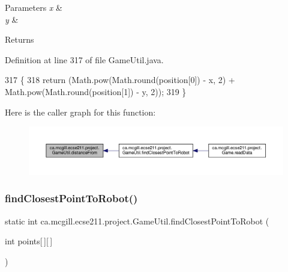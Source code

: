 \begin{DoxyParams}{Parameters}
{\em x} & \\
\hline
{\em y} & \\
\hline
\end{DoxyParams}
\begin{DoxyReturn}{Returns}

\end{DoxyReturn}


Definition at line 317 of file Game\+Util.\+java.


\begin{DoxyCode}
317                                                                      \{
318     \textcolor{keywordflow}{return} (Math.pow(Math.round(position[0]) - x, 2) + Math.pow(Math.round(position[1]) - y, 2));
319   \}
\end{DoxyCode}
Here is the caller graph for this function\+:\nopagebreak
\begin{figure}[H]
\begin{center}
\leavevmode
\includegraphics[width=350pt]{classca_1_1mcgill_1_1ecse211_1_1project_1_1_game_util_a6fb324a3d5e42414c83dfd8bd5910b56_icgraph}
\end{center}
\end{figure}
\mbox{\label{classca_1_1mcgill_1_1ecse211_1_1project_1_1_game_util_a6e0ee94b800ca3727ca8009782abda14}} 
\subsubsection{\texorpdfstring{find\+Closest\+Point\+To\+Robot()}{findClosestPointToRobot()}}
{\footnotesize\ttfamily static int ca.\+mcgill.\+ecse211.\+project.\+Game\+Util.\+find\+Closest\+Point\+To\+Robot (\begin{DoxyParamCaption}\item[{int}]{points\mbox{[}$\,$\mbox{]}\mbox{[}$\,$\mbox{]} }\end{DoxyParamCaption})\hspace{0.3cm}{\ttfamily [static]}}

